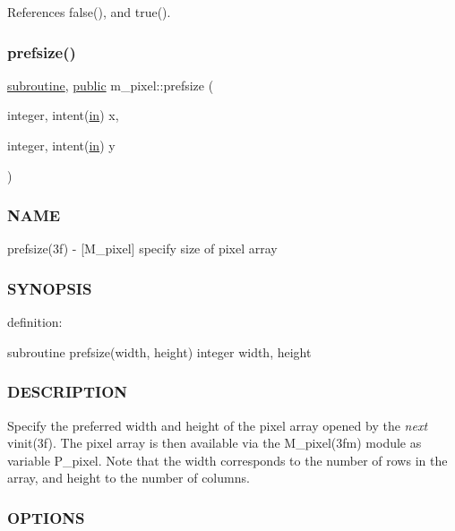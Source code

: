 References false(), and true().

\mbox{\label{namespacem__pixel_acc868686f05b7e0b3cd33bf9d1c6bb98}} 
\subsubsection{\texorpdfstring{prefsize()}{prefsize()}}
{\footnotesize\ttfamily \hyperlink{M__stopwatch_83_8txt_acfbcff50169d691ff02d4a123ed70482}{subroutine}, \hyperlink{M__stopwatch_83_8txt_a2f74811300c361e53b430611a7d1769f}{public} m\+\_\+pixel\+::prefsize (\begin{DoxyParamCaption}\item[{integer, intent(\hyperlink{M__journal_83_8txt_afce72651d1eed785a2132bee863b2f38}{in})}]{x,  }\item[{integer, intent(\hyperlink{M__journal_83_8txt_afce72651d1eed785a2132bee863b2f38}{in})}]{y }\end{DoxyParamCaption})}



\subsubsection*{N\+A\+ME}

prefsize(3f) -\/ \mbox{[}M\+\_\+pixel\mbox{]} specify size of pixel array \subsubsection*{S\+Y\+N\+O\+P\+S\+IS}

definition\+:

subroutine prefsize(width, height) integer width, height

\subsubsection*{D\+E\+S\+C\+R\+I\+P\+T\+I\+ON}

Specify the preferred width and height of the pixel array opened by the {\itshape next} vinit(3f). The pixel array is then available via the M\+\_\+pixel(3fm) module as variable P\+\_\+pixel. Note that the width corresponds to the number of rows in the array, and height to the number of columns.

\subsubsection*{O\+P\+T\+I\+O\+NS}

